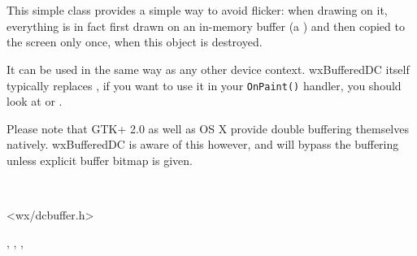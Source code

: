 
\section{}\label{wxbuffereddc}

This simple class provides a simple way to avoid flicker: when drawing on it,
everything is in fact first drawn on an in-memory buffer (a 
) and then copied to the screen only once, when this
object is destroyed.

It can be used in the same way as any other device context. wxBufferedDC itself
typically replaces , if you want to use it in
your \texttt{OnPaint()} handler, you should look at
 or .

Please note that GTK+ 2.0 as well as OS X provide double buffering themselves
natively. wxBufferedDC is aware of this however, and will bypass the buffering
unless explicit buffer bitmap is given.


\\


<wx/dcbuffer.h>


,\rtfsp
{},\rtfsp
{},\rtfsp
{}



\label{wxbuffereddcctor}



